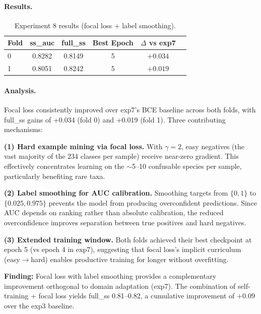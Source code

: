 \paragraph{Results.}

\begin{table}[h]
\centering
\caption{Experiment 8 results (focal loss + label smoothing).}
\label{tab:exp8}
\begin{tabular}{lccccc}
\hline
\textbf{Fold} & \textbf{ss\_auc} & \textbf{full\_ss} & \textbf{Best Epoch} & \textbf{$\Delta$ vs exp7} \\
\hline
0 & 0.8282 & 0.8149 & 5 & $+0.034$ \\
1 & 0.8051 & 0.8242 & 5 & $+0.019$ \\
\hline
\end{tabular}
\end{table}

\paragraph{Analysis.}
Focal loss consistently improved over exp7's BCE baseline across both folds,
with full\_ss gains of +0.034 (fold 0) and +0.019 (fold 1).
Three contributing mechanisms:

\textbf{(1) Hard example mining via focal loss.}
With $\gamma=2$, easy negatives (the vast majority of the 234 classes per sample)
receive near-zero gradient. This effectively concentrates learning on the
$\sim$5--10 confusable species per sample, particularly benefiting rare taxa.

\textbf{(2) Label smoothing for AUC calibration.}
Smoothing targets from $\{0,1\}$ to $\{0.025, 0.975\}$ prevents the model from
producing overconfident predictions. Since AUC depends on ranking rather than
absolute calibration, the reduced overconfidence improves separation between
true positives and hard negatives.

\textbf{(3) Extended training window.}
Both folds achieved their best checkpoint at epoch 5 (vs epoch 4 in exp7),
suggesting that focal loss's implicit curriculum (easy$\to$hard) enables
productive training for longer without overfitting.

\textbf{Finding:} Focal loss with label smoothing provides a complementary
improvement orthogonal to domain adaptation (exp7). The combination of
self-training + focal loss yields full\_ss 0.81--0.82, a cumulative
improvement of $+0.09$ over the exp3 baseline.

